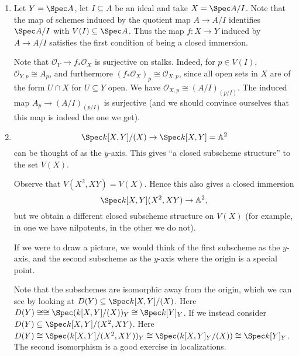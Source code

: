 \begin{enumerate}
	\item Let $Y = \Spec A$, let $I \subseteq A$ be an ideal and take $X = \Spec A/I$. Note
that the map of schemes induced by the quotient map $A\to A/I$ identifies
$\Spec A/I$ with $V(I) \subseteq \Spec A$. Thus the map $f\colon X\to Y$
induced by $A\to A/I$ satisfies the first condition of being a closed immersion.

Note that $\mathcal{O}_Y\to f_*\mathcal{O}_X$ is surjective on stalks. Indeed,
for $p \in V(I)$, $\mathcal{O}_{Y, p} \cong A_p$, and furthermore
$(f_*\mathcal{O}_X)_p\cong \mathcal{O}_{X, p}$, since all open sets in $X$ are
of the form $U\cap X$ for $U \subseteq Y$ open. We have $\mathcal{O}_{X, p} \cong (A/I)_(p/I)$.
The induced map $A_p\to (A/I)_{(p/I)}$ is surjective (and we should convince ourselves
that this map is indeed the one we get).
	\item
		\[ \Spec k[X, Y]/(X) \to \Spec k[X, Y] = \mathbb{A}^2 \]
		can be thought of as the $y$-axis. This gives \enquote{a closed subscheme
		structure} to the set $V(X)$.

		Observe that $V(X^2, XY) = V(X)$. Hence this also gives a closed immersion
		\[ \Spec k[X, Y](X^2, XY) \to \mathbb{A}^2, \]
		but we obtain a different closed subscheme structure on $V(X)$ (for example,
		in one we have nilpotents, in the other we do not).

		If we were to draw a picture, we would think of the first subscheme as the
		$y$-axis, and the second subscheme as the $y$-axis where the origin is
		a special point.

		Note that the subschemes are isomorphic away from the origin, which we can
		see by looking at $D(Y) \subseteq \Spec k[X, Y]/(X)$. Here
		$D(Y) \cong \cong \Spec (k[X, Y]/(X))_Y \cong \Spec k[Y]_Y$. If we instead
		consider $D(Y) \subseteq \Spec k[X, Y]/(X^2, XY)$. Here
		$D(Y)\cong \Spec(k[X, Y]/(X^2, XY))_Y \cong \Spec(k[X, Y]_Y/(X)) \cong \Spec k[Y]_Y$.
		The second isomorphism is a good exercise in localizations.
\end{enumerate}
